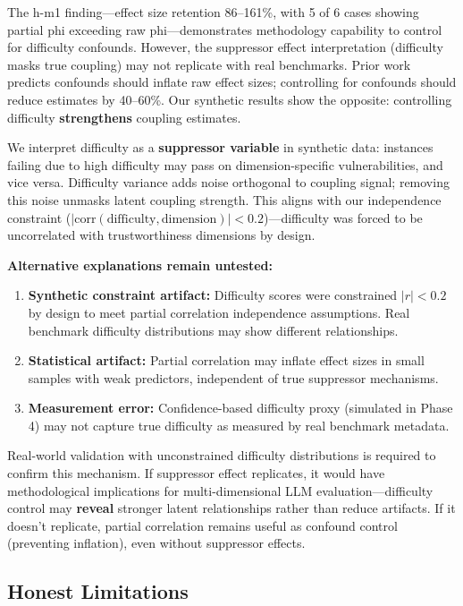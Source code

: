 The h-m1 finding---effect size retention 86--161\%, with 5 of 6 cases showing partial phi exceeding raw phi---demonstrates methodology capability to control for difficulty confounds. However, the suppressor effect interpretation (difficulty masks true coupling) may not replicate with real benchmarks. Prior work predicts confounds should inflate raw effect sizes; controlling for confounds should reduce estimates by 40--60\%. Our synthetic results show the opposite: controlling difficulty \textbf{strengthens} coupling estimates.

We interpret difficulty as a \textbf{suppressor variable} in synthetic data: instances failing due to high difficulty may pass on dimension-specific vulnerabilities, and vice versa. Difficulty variance adds noise orthogonal to coupling signal; removing this noise unmasks latent coupling strength. This aligns with our independence constraint ($|\text{corr}(\text{difficulty}, \text{dimension})| < 0.2$)---difficulty was forced to be uncorrelated with trustworthiness dimensions by design.

\textbf{Alternative explanations remain untested:}
\begin{enumerate}
\item \textbf{Synthetic constraint artifact:} Difficulty scores were constrained $|r| < 0.2$ by design to meet partial correlation independence assumptions. Real benchmark difficulty distributions may show different relationships.
\item \textbf{Statistical artifact:} Partial correlation may inflate effect sizes in small samples with weak predictors, independent of true suppressor mechanisms.
\item \textbf{Measurement error:} Confidence-based difficulty proxy (simulated in Phase 4) may not capture true difficulty as measured by real benchmark metadata.
\end{enumerate}

Real-world validation with unconstrained difficulty distributions is required to confirm this mechanism. If suppressor effect replicates, it would have methodological implications for multi-dimensional LLM evaluation---difficulty control may \textbf{reveal} stronger latent relationships rather than reduce artifacts. If it doesn't replicate, partial correlation remains useful as confound control (preventing inflation), even without suppressor effects.

\subsection{Honest Limitations}

